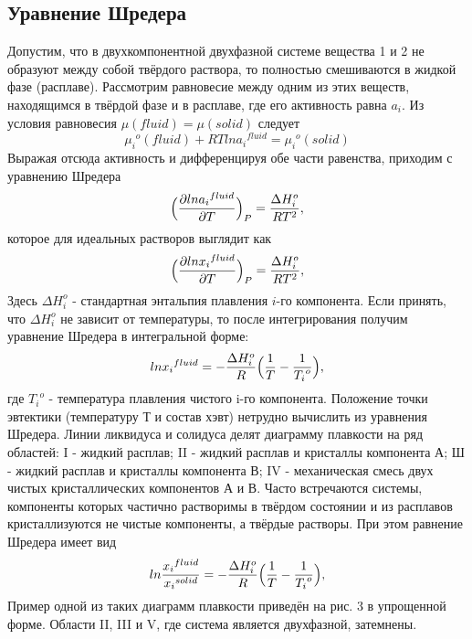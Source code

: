 \documentclass[a4paper,12pt]{article} %
\begin{document}
\subsection{Уравнение Шредера}
Допустим, что в двухкомпонентной двухфазной 
системе вещества 1 и 2 не образуют между собой твёрдого раствора, то 
полностью смешиваются в жидкой фазе (расплаве). Рассмотрим равновесие 
между одним из этих веществ, находящимся в твёрдой фазе и в расплаве, где 
его активность равна $a_i$. 
Из условия равновесия $\mu(fluid) = \mu(solid)$ следует
\begin{equation}
    {\mu_i}^{o}(fluid) + RTln{a_i}^{fluid} = {\mu_i}^{o}(solid)
\end{equation}
Выражая отсюда активность и дифференцируя обе части равенства, приходим с уравнению Шредера
\begin{equation}
     \Bigl(\frac{\partial ln{a_i}^{fluid}}{\partial T}\Bigr)_P = \frac{\Delta H_i^{o}}{RT^2},
\end{equation}
которое для идеальных растворов выглядит как 
\begin{equation}
     \Bigl(\frac{\partial ln{x_i}^{fluid}}{\partial T}\Bigr)_P = \frac{\Delta H_i^{o}}{RT^2},
\end{equation}
Здесь $\Delta H_i^{o}$ - стандартная энтальпия плавления $i$-го компонента. 
Если принять, что $\Delta H_i^{o}$ не зависит от температуры, то после интегрирования получим уравнение Шредера в интегральной форме: 
\begin{equation}
    ln{x_i}^{fluid} = -\frac{\Delta H_i^{o}}{R}\Bigl(\frac{1}{T} - \frac{1}{{T_i}^{o}}\Bigr),
\end{equation}
где ${T_i}^{o}$ - температура плавления чистого i-го компонента. 
Положение точки эвтектики (температуру Т и состав хэвт) нетрудно 
вычислить из уравнения Шредера. 
Линии ликвидуса и солидуса делят диаграмму плавкости на ряд 
областей: I - жидкий расплав; II - жидкий расплав и кристаллы компонента А; 
Ш - жидкий расплав и кристаллы компонента В; IV - механическая смесь двух 
чистых кристаллических компонентов А и В. 
Часто встречаются системы, компоненты которых частично растворимы 
в твёрдом состоянии и из расплавов кристаллизуются не чистые компоненты, 
а твёрдые растворы. При этом равнение Шредера имеет вид 
\begin{equation}
    ln\frac{{x_i}^{fluid}}{{x_i}^{solid}} = -\frac{\Delta H_i^{o}}{R}\Bigl(\frac{1}{T} - \frac{1}{{T_i}^{o}}\Bigr),
\end{equation}
Пример одной из таких диаграмм плавкости приведён на рис. 3 в 
упрощенной форме. Области II, III и V, где система является двухфазной, 
затемнены. 
\end{document}
